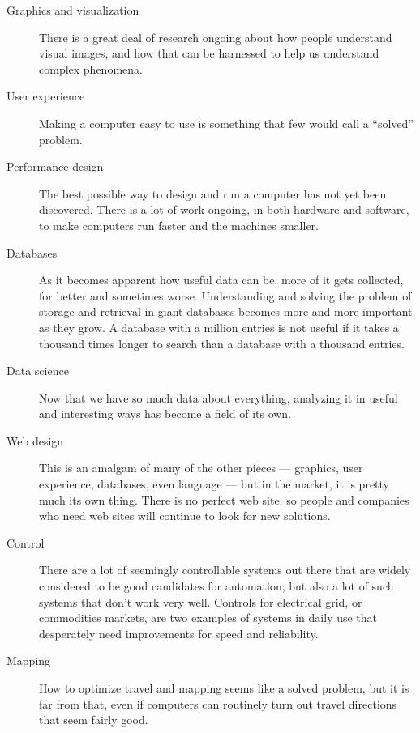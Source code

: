 \documentclass[11pt]{article}
\begin{document}
\begin{description}

\item[Graphics and visualization] There is a great deal of research
  ongoing about how people understand visual images, and how that can
  be harnessed to help us understand complex phenomena.

\item[User experience] Making a computer easy to use is something
  that few would call a ``solved'' problem.

\item[Performance design] The best possible way to design and run a
  computer has not yet been discovered.  There is a lot of work
  ongoing, in both hardware and software, to make computers run faster
  and the machines smaller.

\item[Databases] As it becomes apparent how useful data can be, more
  of it gets collected, for better and sometimes worse.  Understanding
  and solving the problem of storage and retrieval in giant databases
  becomes more and more important as they grow.  A database with a
  million entries is not useful if it takes a thousand times longer to
  search than a database with a thousand entries.

\item[Data science] Now that we have so much data about everything,
  analyzing it in useful and interesting ways has become a field of
  its own.

\item[Web design] This is an amalgam of many of the other pieces ---
  graphics, user experience, databases, even language --- but in the
  market, it is pretty much its own thing.  There is no perfect web
  site, so people and companies who need web sites will continue to
  look for new solutions.

\item[Control] There are a lot of seemingly controllable systems out
  there that are widely considered to be good candidates for
  automation, but also a lot of such systems that don't work
  very well.  Controls for electrical grid, or commodities
  markets, are two examples of systems in daily use that desperately
  need improvements for speed and reliability.

\item[Mapping] How to optimize travel and mapping seems like a solved
  problem, but it is far from that, even if computers can routinely
  turn out travel directions that seem fairly good.


\end{description}
\end{document}
